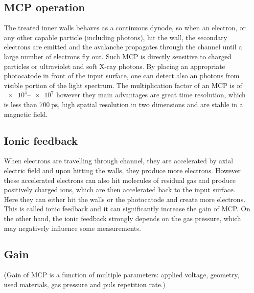 \subsection{MCP operation}
The treated inner walls behaves as a continuous dynode, so when an electron, or any other capable
particle (including photons), hit the wall, the secondary electrons are emitted and the avalanche
propagates through the channel until a large number of electrons fly out. Such MCP is directly
sensitive to charged particles or ultraviolet and soft X-ray photons. By placing an appropriate
photocatode in front of the input surface, one can detect also an photons from visible portion
of the light spectrum. The multiplication factor of an MCP is of $\numrange{e4}{e7}$ however they
main advantages are great time resolution, which is less than $\SI{700}{\pico\second}$, high
spatial resolution in two dimensions and are stable in a magnetic field.

\subsection{Ionic feedback}
When electrons are travelling through channel, they are accelerated by axial electric field and
upon hitting the walls, they produce more electrons. However these accelerated electrons can also
hit molecules of residual gas and produce positively charged ions, which are then accelerated back
to the input surface. Here they can either hit the walls or the photocatode and create more electrons.
This is called ionic feedback and it can significantly increase the gain of MCP. On the other hand,
the ionic feedback strongly depends on the gas pressure, which may negatively influence some
measurements.

\subsection{Gain}
(Gain of MCP is a function of multiple parameters: applied voltage,
geometry, used materials, gas pressure and puls repetition rate.)

